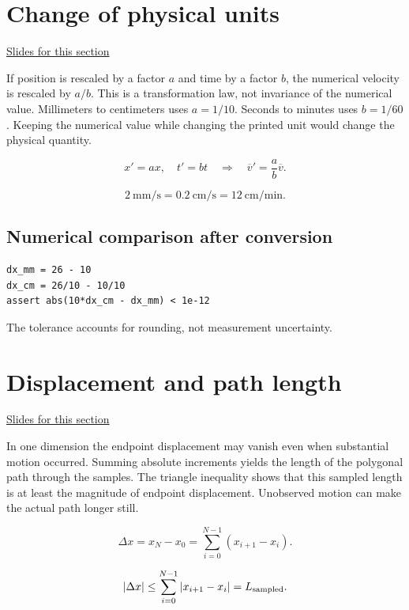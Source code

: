 \documentclass[11pt,letterpaper]{article}
\theoremstyle{definition}\newtheorem{definition}{Definition}\newtheorem{example}{Example}
\numberwithin{equation}{section}
\begin{document}
\section{Change of physical units}
\hypertarget{note-change-of-physical-units}{}\label{note:change-of-physical-units}
{\small \href{slides.html\#frame=change-of-physical-units\&step=1}{Slides for this section}}\par
If position is rescaled by a factor $a$ and time by a factor $b$, the numerical velocity is rescaled by $a/b$. This is a transformation law, not invariance of the numerical value. Millimeters to centimeters uses $a=1/10$. Seconds to minutes uses $b=1/60$. Keeping the numerical value while changing the printed unit would change the physical quantity.

\[
x'=ax,\quad t'=bt\quad\Longrightarrow\quad\overline v'=\frac ab\overline v.
\]

\[
2\ \mathrm{mm/s}=0.2\ \mathrm{cm/s}=12\ \mathrm{cm/min}.
\]

\subsection*{Numerical comparison after conversion}
\begin{minipage}{\linewidth}
\begin{verbatim}
dx_mm = 26 - 10
dx_cm = 26/10 - 10/10
assert abs(10*dx_cm - dx_mm) < 1e-12
\end{verbatim}
\end{minipage}

The tolerance accounts for rounding, not measurement uncertainty.
\section{Displacement and path length}
\hypertarget{note-displacement-and-path-length}{}\label{note:displacement-and-path-length}
{\small \href{slides.html\#frame=displacement-and-path-length\&step=1}{Slides for this section}}\par
In one dimension the endpoint displacement may vanish even when substantial motion occurred. Summing absolute increments yields the length of the polygonal path through the samples. The triangle inequality shows that this sampled length is at least the magnitude of endpoint displacement. Unobserved motion can make the actual path longer still.

\[
\Delta x=x_N-x_0=\sum_{i=0}^{N-1}(x_{i+1}-x_i).
\]

\[
|\Delta x|\leq\sum_{i=0}^{N-1}|x_{i+1}-x_i|=L_{\rm sampled}.
\]
\end{document}
